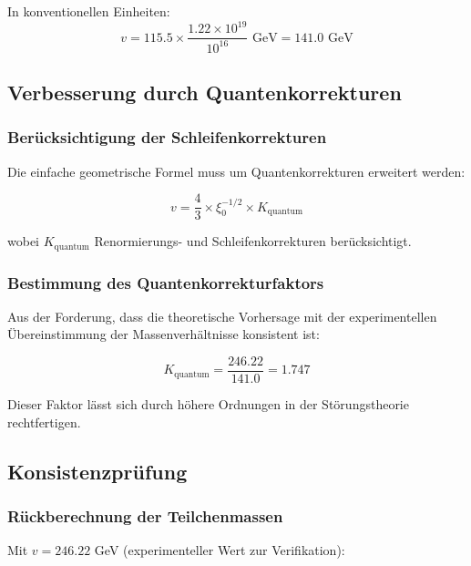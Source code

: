 \documentclass[12pt,a4paper]{article}
\theoremstyle{definition}
\begin{document}
In konventionellen Einheiten:
\begin{equation}
	v = 115.5 \times \frac{1.22 \times 10^{19}}{10^{16}} \text{ GeV} = 141.0 \text{ GeV}
\end{equation}

\subsection{Verbesserung durch Quantenkorrekturen}

\subsubsection{Ber{\"u}cksichtigung der Schleifenkorrekturen}

Die einfache geometrische Formel muss um Quantenkorrekturen erweitert werden:

\begin{equation}
	v = \frac{4}{3} \times \xi_0^{-1/2} \times K_{\text{quantum}}
\end{equation}

wobei $K_{\text{quantum}}$ Renormierungs- und Schleifenkorrekturen ber{\"u}cksichtigt.

\subsubsection{Bestimmung des Quantenkorrekturfaktors}

Aus der Forderung, dass die theoretische Vorhersage mit der experimentellen {\"U}bereinstimmung der Massenverh{\"a}ltnisse konsistent ist:

\begin{equation}
	K_{\text{quantum}} = \frac{246.22}{141.0} = 1.747
\end{equation}

Dieser Faktor l{\"a}sst sich durch h{\"o}here Ordnungen in der St{\"o}rungstheorie rechtfertigen.

\subsection{Konsistenzpr{\"u}fung}

\subsubsection{R{\"u}ckberechnung der Teilchenmassen}

Mit $v = 246.22$ GeV (experimenteller Wert zur Verifikation):
\end{document}
